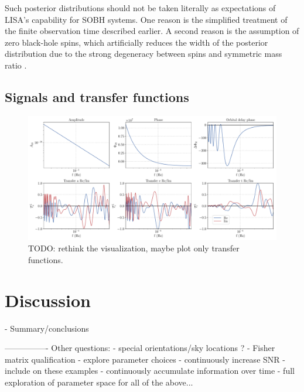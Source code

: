 \documentclass[aps,showpacs,twocolumn,prd,superscriptaddress,nofootinbib]{revtex4-1}
\newcommand{\SM}[1]{{\color{Blue} #1}}
\begin{document}
Such posterior distributions should not be taken literally as expectations of
LISA's capability for SOBH systems. One reason is the simplified treatment of
the finite observation time described earlier. A second reason is the assumption
of zero black-hole spins, which artificially reduces the width of the posterior
distribution due to the strong degeneracy between spins and symmetric mass
ratio \cite{Baird+2013}.


\subsection{Signals and transfer functions}
\label{subsec:signaltransferSOBH}

\begin{figure}
  \centering
  \includegraphics[width=.98\linewidth]{../plots/plot_sobh1_tdi.pdf}
  \caption{\SM{TODO: rethink the visualization, maybe plot only transfer functions}.}
  \label{fig:PEsmbh22hmCase0}
\end{figure}


\section{Discussion}
\label{sec:discussion}

- Summary/conclusions


----------------
Other questions:
- special orientations/sky locations ?
- Fisher matrix qualification - explore parameter choices
- continuously increase SNR - include on these examples
- continuously accumulate information over time
- full exploration of parameter space for all of the above...


\end{document}
